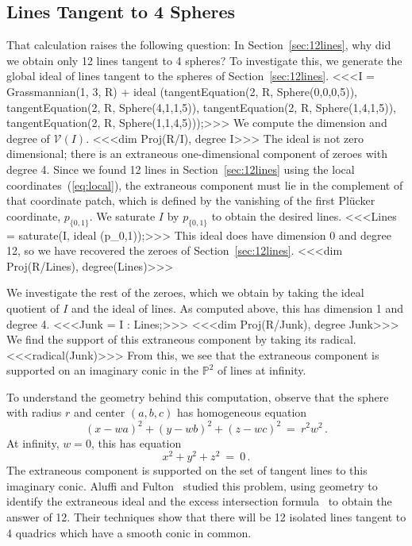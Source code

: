 \subsection{Lines Tangent to 4 Spheres}\label{sec:tangent_lines}
That calculation raises the following question:
In Section~\ref{sec:12lines}, why did we obtain only 12 lines tangent to 4
spheres? 
To investigate this, we generate the global ideal of lines tangent to the 
spheres of Section~\ref{sec:12lines}.
%
<<<I = Grassmannian(1, 3, R) + 
        ideal (tangentEquation(2, R, Sphere(0,0,0,5)),
               tangentEquation(2, R, Sphere(4,1,1,5)),
               tangentEquation(2, R, Sphere(1,4,1,5)),
               tangentEquation(2, R, Sphere(1,1,4,5)));>>>
%
We compute the dimension and degree of ${\mathcal V}(I)$.
%
<<<dim Proj(R/I), degree I>>>
%
The ideal is not zero dimensional; there is an
extraneous one-dimensional 
component of zeroes with degree 4.
Since we found 12 lines in
Section~\ref{sec:12lines} using the local coordinates~(\ref{eq:local}),
the extraneous component must lie in the complement of that coordinate patch,
which is defined by the vanishing of the first Pl\"ucker coordinate, $p_{\{0,1\}}$.
We saturate $I$ by $p_{\{0,1\}}$ to obtain the desired lines.
%
<<<Lines = saturate(I, ideal (p_{0,1}));>>>
%
This ideal does have dimension 0 and degree 12, so we have recovered the
zeroes of Section~\ref{sec:12lines}.
%
<<<dim Proj(R/Lines), degree(Lines)>>>
%

We investigate the rest of the zeroes, which we obtain 
by taking the ideal
quotient of $I$ and the ideal of lines.
As computed above, this has dimension 1 and degree 4.
%
<<<Junk = I : Lines;>>>
%
<<<dim Proj(R/Junk), degree Junk>>>
%
We find the support of this extraneous component by taking its
radical.
%
<<<radical(Junk)>>>
%
From this, we see that the extraneous component is supported on an imaginary
conic in the ${\mathbb P}^2$ of lines at infinity.
\smallskip

To understand the geometry behind this computation, observe that
the sphere with radius $r$ and center $(a,b,c)$ has homogeneous equation
$$
  (x-wa)^2+(y-wb)^2+(z-wc)^2\ =\ r^2w^2\,.
$$
At infinity, $w=0$, this has equation
$$
  x^2+y^2+z^2\ =\ 0\,.
$$
The extraneous component is supported on the set of tangent
lines to this imaginary conic.
Aluffi and Fulton~\cite{SO:AF} studied
this problem, using geometry to 
identify the extraneous ideal and the excess intersection
formula~\cite{SO:FM76} to obtain the answer of 12. 
Their techniques show that there will be 12 isolated lines tangent to 4
quadrics which have a smooth conic in common.

